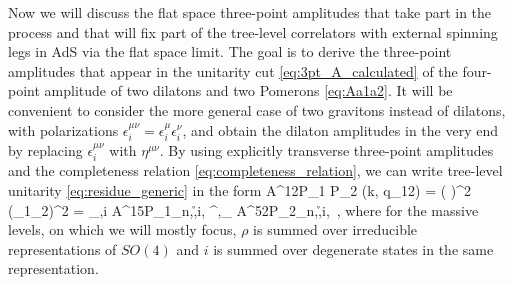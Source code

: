 Now we will discuss the flat space three-point amplitudes that take part in the process and that will fix part of the tree-level correlators with external spinning legs in AdS via the flat space limit. 
The goal is to derive the three-point amplitudes that appear in the unitarity cut \eqref{eq:3pt_A_calculated} of the
four-point amplitude of two dilatons and two Pomerons \eqref{eq:Aa1a2}. It will be convenient to consider the more general case of two gravitons instead of dilatons, with polarizations $\epsilon_i^{\mu\nu}=\epsilon_i^{\mu}\epsilon_i^{\nu}$, and obtain the dilaton amplitudes in the very end by replacing $\epsilon_i^{\mu\nu}$ with $\eta^{\mu\nu}$.
By using explicitly transverse three-point amplitudes and the completeness relation \eqref{eq:completeness_relation}, we can write tree-level unitarity \eqref{eq:residue_generic}
in the form
	\beq
		 A^{12P_1 P_2} (k, q_{12})
		= \left(  \right)^2 (\epsilon_1\cdot \epsilon_2)^2
		= \sum\limits_{\rho,i} A^{15P_1}_{n,\r,i,}
\pi^{,}_{\rho}
		A^{52P_2}_{n,\r,i,} \,,
		\label{eq:A12_cut}
	\eeq
where for the massive levels, on which we will mostly focus, $\rho$ is summed over irreducible representations of $SO(4)$ and $i$ is summed over degenerate states in the same representation.

